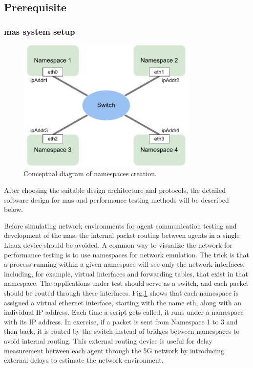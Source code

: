 \subsection{Prerequisite}
\subsubsection{\gls{mas} system setup}
 

\begin{figure}[htbp]
    \centering
\includegraphics[width=0.8\textwidth]{figures/methodology/NamespaceConceptual.pdf}
\caption{Conceptual diagram of namespaces creation.
\label{fig: NSConceptual}}
\end{figure}

After choosing the suitable design architecture and protocols, the detailed 
software design for \gls{mas} and performance testing methods will be described below. 

Before simulating network environments for agent communication testing 
and development of the \gls{mas}, the internal packet routing between agents 
in a single Linux device should be avoided. A common way to visualize 
the network for performance testing is to use namespaces for network 
emulation. The trick is that a process running within a given
namespace will see only the network interfaces, including, for example, 
virtual interfaces and forwarding tables, that exist in that namespace. 
The applications under test should serve as a
switch, and each packet should be routed through these interfaces. 
Fig.\ref{fig: NSConceptual} shows that each namespace is assigned 
a virtual ethernet interface, 
starting with the name eth, along with an individual IP address. 
Each time a script gets called, it runs under a namespace with its 
IP address. In exercise, if a packet is sent from
Namespace 1 to 3 and then back; it is routed by the switch instead of 
bridges between namespaces to avoid internal routing. This external routing 
device is useful for delay measurement between each agent through the 5G network 
by introducing external delays to estimate the network environment. 

